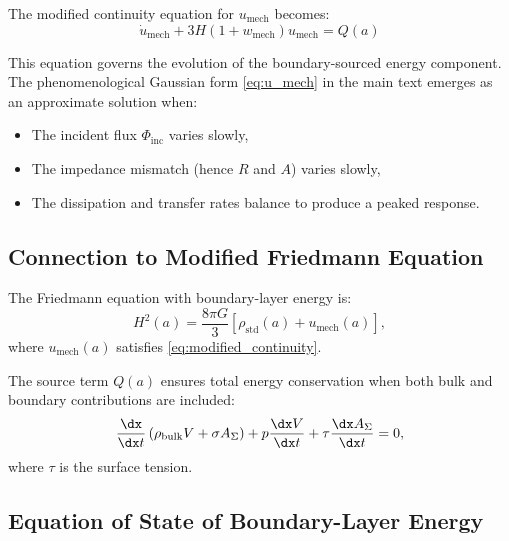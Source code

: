 The modified continuity equation for $u_{\text{mech}}$ becomes:
\begin{equation}
\label{eq:modified_continuity}
\boxed{\dot{u}_{\text{mech}} + 3H(1 + w_{\text{mech}}) u_{\text{mech}} = Q(a)}
\end{equation}

This equation governs the evolution of the boundary-sourced energy component. The phenomenological Gaussian form \eqref{eq:u_mech} in the main text emerges as an approximate solution when:
\begin{itemize}
    \item The incident flux $\Phi_{\text{inc}}$ varies slowly,
    \item The impedance mismatch (hence $R$ and $A$) varies slowly,
    \item The dissipation and transfer rates balance to produce a peaked response.
\end{itemize}

\subsection{Connection to Modified Friedmann Equation}
\label{app:Friedmann_connection}

\begin{proposition}
\label{prop:Friedmann_connection}
The Friedmann equation with boundary-layer energy is:
\begin{equation}
\label{eq:Friedmann_umech}
H^2(a) = \frac{8\pi G}{3} \left[ \rho_{\text{std}}(a) + u_{\text{mech}}(a) \right],
\end{equation}
where $u_{\text{mech}}(a)$ satisfies \eqref{eq:modified_continuity}.
\end{proposition}

The source term $Q(a)$ ensures total energy conservation when both bulk and boundary contributions are included:
\begin{equation}
\label{eq:total_conservation_check}
\frac{\dx}{\dx t} \left( \rho_{\text{bulk}} V + \sigma A_\Sigma \right) + p \frac{\dx V}{\dx t} + \tau \frac{\dx A_\Sigma}{\dx t} = 0,
\end{equation}
where $\tau$ is the surface tension.

\subsection{Equation of State of Boundary-Layer Energy}
\label{app:EOS_umech}

